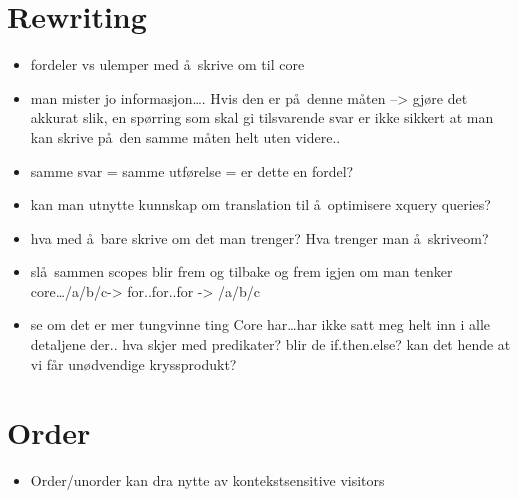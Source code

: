 \section{Rewriting}
\label{sect:disc:rewriting}
\begin{itemize}
  \item fordeler vs ulemper med \aa~skrive om til core
  \item man mister jo informasjon\ldots. Hvis den er p\aa~denne m\aa ten --> gj\o re det akkurat
	  slik, en sp\o rring som skal gi tilsvarende svar er ikke sikkert at man kan
	  skrive p\aa~den samme m\aa ten helt uten videre..  
  \item samme svar = samme utf\o relse = er dette en fordel?
  \item kan man utnytte kunnskap om translation til \aa~optimisere xquery queries?
  \item hva med \aa~bare skrive om det man trenger? Hva trenger man \aa~skriveom?
  \item sl\aa~sammen scopes blir frem og tilbake og frem igjen om man tenker core\ldots /a/b/c-> for..for..for ->
  /a/b/c
  \item se om det er mer tungvinne ting Core har\ldots har ikke satt meg helt inn i alle detaljene der.. hva skjer
  med predikater? blir de if.then.else? kan det hende at vi f\aa r un\o dvendige kryssprodukt?
\end{itemize}





\section{Order}
\label{sect:disc:order}
\begin{itemize}
  \item Order/unorder kan dra nytte av kontekstsensitive visitors
\end{itemize}

